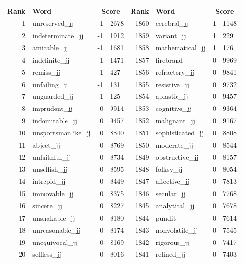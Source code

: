 \begin{table}[tbp]
    \begin{tabular}{| rlr@{.}l | rlr@{.}l |}
    \hline
    \textbf{Rank} & \textbf{Word} & \multicolumn{2}{c|}{\textbf{Score}} & \textbf{Rank} & \textbf{Word} & \multicolumn{2}{c|}{\textbf{Score}} \\
    \hline
    1 & unreserved\_jj & -1 & 2678    &    1860 & cerebral\_jj & 1 & 1148 \\
    2 & indeterminate\_jj & -1 & 1912    &    1859 & variant\_jj & 1 & 229 \\
    3 & amicable\_jj & -1 & 1681    &    1858 & mathematical\_jj & 1 & 176 \\
    4 & indefinite\_jj & -1 & 1471    &    1857 & firebrand & 0 & 9969 \\
    5 & remiss\_jj & -1 & 427    &    1856 & refractory\_jj & 0 & 9841 \\
    6 & unfailing\_jj & -1 & 131    &    1855 & resistive\_jj & 0 & 9732 \\
    7 & unguarded\_jj & -1 & 125    &    1854 & aplastic\_jj & 0 & 9457 \\
    8 & imprudent\_jj & 0 & 9914    &    1853 & cognitive\_jj & 0 & 9364 \\
    9 & indomitable\_jj & 0 & 9457    &    1852 & malignant\_jj & 0 & 9167 \\
    10 & unsportsmanlike\_jj & 0 & 8840    &    1851 & sophisticated\_jj & 0 & 8808 \\
    11 & abject\_jj & 0 & 8769    &    1850 & moderate\_jj & 0 & 8544 \\
    12 & unfaithful\_jj & 0 & 8734    &    1849 & obstructive\_jj & 0 & 8157 \\
    13 & unselfish\_jj & 0 & 8595    &    1848 & folksy\_jj & 0 & 8054 \\
    14 & intrepid\_jj & 0 & 8449    &    1847 & affective\_jj & 0 & 7813 \\
    15 & immovable\_jj & 0 & 8375    &    1846 & secular\_jj & 0 & 7768 \\
    16 & sincere\_jj & 0 & 8227    &    1845 & analytical\_jj & 0 & 7678 \\
    17 & unshakable\_jj & 0 & 8180    &    1844 & pundit & 0 & 7614 \\
    18 & unreasonable\_jj & 0 & 8174    &    1843 & nonvolatile\_jj & 0 & 7545 \\
    19 & unequivocal\_jj & 0 & 8169    &    1842 & rigorous\_jj & 0 & 7417 \\
    20 & selfless\_jj & 0 & 8016    &    1841 & refined\_jj & 0 & 7403 \\

\end{tabular}
\end{table}

